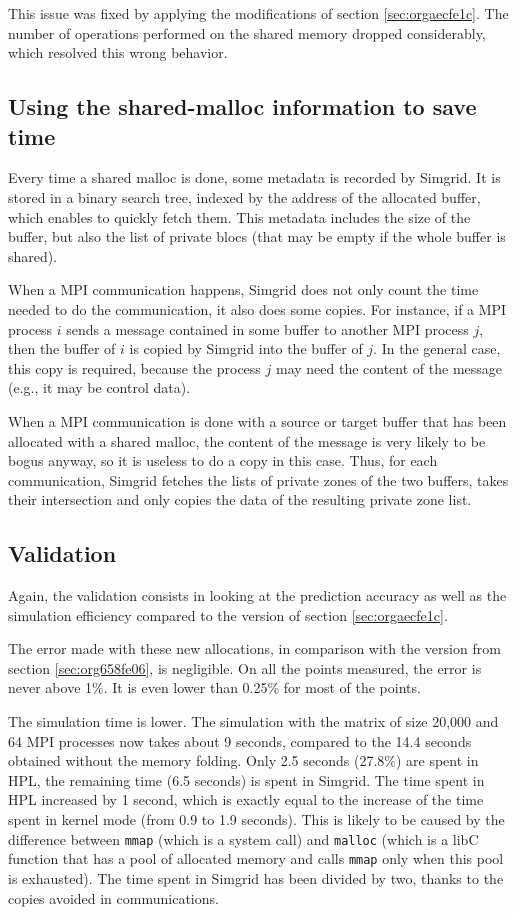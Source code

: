 \documentclass[12pt, a4paper]{memoir}
\begin{document}
This issue was fixed by applying the modifications of section \ref{sec:orgaecfe1c}. The number of operations
performed on the shared memory dropped considerably, which resolved this wrong behavior.
\subsection{Using the shared-malloc information to save time}
\label{sec:orge23699c}
Every time a shared malloc is done, some metadata is recorded by Simgrid. It is stored in a binary search tree,
indexed by the address of the allocated buffer, which enables to quickly fetch them. This metadata includes the size
of the buffer, but also the list of private blocs (that may be empty if the whole buffer is shared).

When a MPI communication happens, Simgrid does not only count the time needed to do the communication, it also does
some copies. For instance, if a MPI process \(i\) sends a message contained in some buffer to another MPI process \(j\),
then the buffer of \(i\) is copied by Simgrid into the buffer of \(j\). In the general case, this copy is required,
because the process \(j\) may need the content of the message (e.g., it may be control data).

When a MPI communication is done with a source or target buffer that has been allocated with a shared malloc, the
content of the message is very likely to be bogus anyway, so it is useless to do a copy in this case. Thus, for each
communication, Simgrid fetches the lists of private zones of the two buffers, takes their intersection and only copies
the data of the resulting private zone list.
\subsection{Validation}
\label{sec:orgcab61e5}
Again, the validation consists in looking at the prediction accuracy as well as the simulation efficiency compared
to the version of section \ref{sec:orgaecfe1c}.

The error made with these new allocations, in comparison with the version from section
\ref{sec:org658fe06}, is negligible. On all the points measured, the error is never above 1\%. It is even
lower than 0.25\% for most of the points.

The simulation time is lower. The simulation with the matrix of size 20,000 and 64 MPI processes now takes about 9
seconds, compared to the 14.4 seconds obtained without the memory folding. Only 2.5 seconds (27.8\%) are spent in
HPL, the remaining time (6.5 seconds) is spent in Simgrid. The time spent in HPL increased by 1 second, which is
exactly equal to the increase of the time spent in kernel mode (from 0.9 to 1.9 seconds). This is likely to be
caused by the difference between \texttt{mmap} (which is a system call) and \texttt{malloc} (which is a libC function that has a pool
of allocated memory and calls \texttt{mmap} only when this pool is exhausted). The time spent in Simgrid has been divided by
two, thanks to the copies avoided in communications.
\end{document}
